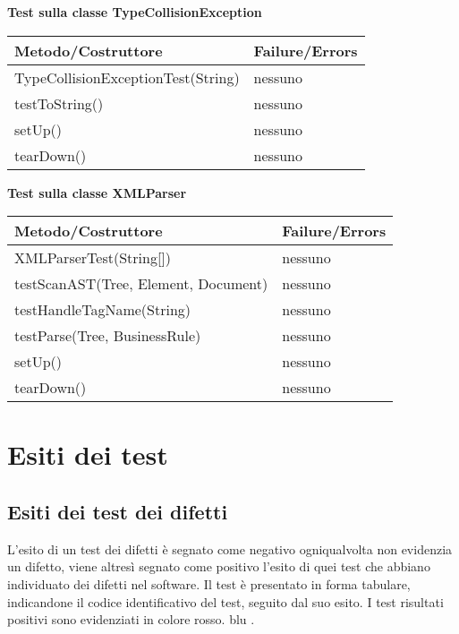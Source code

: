 \textbf{Test sulla classe TypeCollisionException}\\
\begin{center}
\begin{tabular}{|p{}|p{3 cm}|} \hline
\textbf{Metodo/Costruttore} & \textbf{Failure/Errors} \\ \hline
TypeCollisionExceptionTest(String) & nessuno \\ \hline
testToString() & nessuno \\ \hline
setUp() & nessuno \\ \hline
tearDown() & nessuno \\ \hline
\end{tabular}
\end{center}

\textbf{Test sulla classe XMLParser}\\
\begin{center}
\begin{tabular}{|p{}|p{3 cm}|} \hline
\textbf{Metodo/Costruttore} & \textbf{Failure/Errors} \\ \hline
XMLParserTest(String[]) & nessuno \\ \hline
testScanAST(Tree, Element, Document) & nessuno \\ \hline
testHandleTagName(String) & nessuno \\ \hline
testParse(Tree, BusinessRule) & nessuno \\ \hline
setUp() & nessuno \\ \hline
tearDown() & nessuno \\ \hline
\end{tabular}
\end{center}

\chapter{Esiti dei test}

\section{Esiti dei test dei difetti}
L'esito di un test dei difetti \`e segnato come negativo ogniqualvolta non evidenzia un difetto, viene altres\`i segnato come positivo l'esito di quei test che abbiano individuato dei difetti nel software.
Il test \`e presentato in forma tabulare, indicandone il codice identificativo del test, seguito dal suo esito. I test risultati positivi sono evidenziati in colore \textcolor{err}{rosso}. 
 \textcolor{rt}{blu} .

